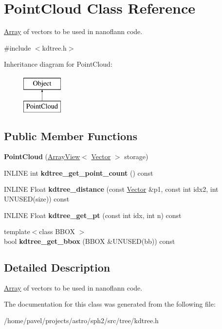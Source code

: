 \hypertarget{classPointCloud}{}\section{Point\+Cloud Class Reference}
\label{classPointCloud}


\hyperlink{classArray}{Array} of vectors to be used in nanoflann code.  




{\ttfamily \#include $<$kdtree.\+h$>$}

Inheritance diagram for Point\+Cloud\+:\begin{figure}[H]
\begin{center}
\leavevmode
\includegraphics[height=2.000000cm]{classPointCloud}
\end{center}
\end{figure}
\subsection*{Public Member Functions}
\begin{DoxyCompactItemize}
\item 
\hypertarget{classPointCloud_a4ad620d47bd52a25d3eb1e3b0fc0528b}{}\label{classPointCloud_a4ad620d47bd52a25d3eb1e3b0fc0528b} 
{\bfseries Point\+Cloud} (\hyperlink{classArrayView}{Array\+View}$<$ \hyperlink{classBasicVector}{Vector} $>$ storage)
\item 
\hypertarget{classPointCloud_a4fcb3a84da1fae67d4a8812b075b4f14}{}\label{classPointCloud_a4fcb3a84da1fae67d4a8812b075b4f14} 
I\+N\+L\+I\+NE int {\bfseries kdtree\+\_\+get\+\_\+point\+\_\+count} () const
\item 
\hypertarget{classPointCloud_a51d0dbdd3a8425c7f451df7a5f7a91df}{}\label{classPointCloud_a51d0dbdd3a8425c7f451df7a5f7a91df} 
I\+N\+L\+I\+NE Float {\bfseries kdtree\+\_\+distance} (const \hyperlink{classBasicVector}{Vector} \&p1, const int idx2, int U\+N\+U\+S\+ED(size)) const
\item 
\hypertarget{classPointCloud_a87744cb85ba9aa2c0975fe6e6d3f7a1e}{}\label{classPointCloud_a87744cb85ba9aa2c0975fe6e6d3f7a1e} 
I\+N\+L\+I\+NE Float {\bfseries kdtree\+\_\+get\+\_\+pt} (const int idx, int n) const
\item 
\hypertarget{classPointCloud_a900fa261a2708f48cc6c1e9411755d3e}{}\label{classPointCloud_a900fa261a2708f48cc6c1e9411755d3e} 
{\footnotesize template$<$class B\+B\+OX $>$ }\\bool {\bfseries kdtree\+\_\+get\+\_\+bbox} (B\+B\+OX \&U\+N\+U\+S\+ED(bb)) const
\end{DoxyCompactItemize}


\subsection{Detailed Description}
\hyperlink{classArray}{Array} of vectors to be used in nanoflann code. 

The documentation for this class was generated from the following file\+:\begin{DoxyCompactItemize}
\item 
/home/pavel/projects/astro/sph2/src/tree/kdtree.\+h\end{DoxyCompactItemize}
